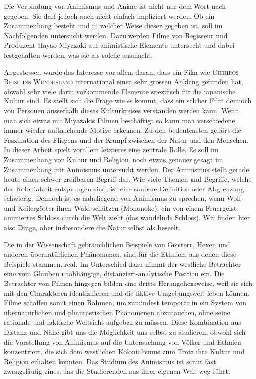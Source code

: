 
Die Verbindung von Animismus und Anime ist nicht nur dem Wort nach gegeben. Sie darf jedoch auch nicht einfach impliziert werden. Ob ein Zusammenhang besteht und in welcher Weise dieser gegeben ist, soll im Nachfolgenden untersucht werden. Dazu werden Filme von Regisseur und Produzent Hayao Miyazaki auf animistische Elemente untersucht und dabei festgehalten werden, was sie als solche ausmacht.

Angestossen wurde das Interesse vor allem daran, dass ein Film wie \textsc{Chihiros Reise ins Wunderland} international einen sehr grossen Anklang gefunden hat, obwohl sehr viele darin vorkommende Elemente spezifisch für die japanische Kultur sind. Es stellt sich die Frage wie es kommt, dass ein solcher Film dennoch von Personen ausserhalb dieses Kulturkreises verstanden werden kann. Wenn man sich etwas mit Miyazakis Filmen beschäftigt so kann man verschiedene immer wieder auftauchende Motive erkennen. Zu den bedeutensten gehört die Faszination des Fliegens und der Kampf zwischen der Natur und den Menschen. In dieser Arbeit spielt vorallem letzteres eine zentrale Rolle. Es soll im Zusammenhang von Kultur und Religion, noch etwas genauer gesagt im Zusammenhang mit Animismus untersucht werden. Der Animismus stellt gerade heute einen schwer greifbaren Begriff dar. Wie viele Themen und Begriffe, welche der Kolonialzeit entsprungen sind, ist eine saubere Definition oder Abgrenzung schwierig. Dennoch ist es naheliegend von Animismus zu sprechen, wenn Wolf- und Keilergötter ihren Wald schützen (Mononoke), ein von einem Feuergeist animiertes Schloss durch die Welt zieht (das wandelnde Schloss). Wir finden hier also Dinge, aber insbesondere die Natur selbst als beseelt. 

Die in der Wissenschaft gebräuchlichen Beispiele von Geistern, Hexen und anderen übernatürlichen Phänomenen, sind für die Ethnien, aus denen diese Beispiele stammen, real. Im Unterschied dazu nimmt der westliche Betrachter eine vom Glauben unabhängige, distanziert-analytische Position ein. Die Betrachter von Filmen hingegen bilden eine dritte Herangehensweise, weil sie sich mit den Charakteren identizifieren und die fiktive Umgebungswelt leben können. Filme schaffen somit einen Rahmen, um zumindest temporär in ein System von übernatürlichen und phantastischen Phänomenen abzutauchen, ohne seine rationale und faktische Weltsicht aufgeben zu müssen. Diese Kombination aus Distanz und Nähe gibt uns die Möglichkeit uns selbst zu studieren, obwohl sich die Vorstellung von Animismus auf die Untersuchung von Völker und Ethnien konzentriert, die sich dem westlichen Kolonialismus zum Trotz ihre Kultur und Religion erhalten konnten. Das Studium des Animismus ist somit fast zwangsläufig eines, das die Studierenden aus ihrer eigenen Welt weg führt.  

